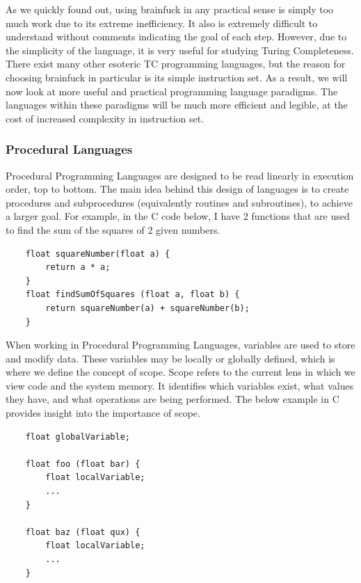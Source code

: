 As we quickly found out, using brainfuck in any practical sense is simply too much work due to its extreme inefficiency.
It also is extremely difficult to understand without comments indicating the goal of each step.
However, due to the simplicity of the language, it is very useful for studying Turing Completeness.
There exist many other esoteric TC programming languages, but the reason for choosing brainfuck in particular is its simple instruction set.
As a result, we will now look at more useful and practical programming language paradigms.
The languages within these paradigms will be much more efficient and legible, at the cost of increased complexity in instruction set.

\subsubsection{Procedural Languages}\label{subsubsec:PL}

Procedural Programming Languages are designed to be read linearly in execution order, top to bottom.
The main idea behind this design of languages is to create procedures and subprocedures (equivalently routines and subroutines), to achieve a larger goal.
For example, in the C code below, I have 2 functions that are used to find the sum of the squares of 2 given numbers. 

\begin{verbatim}
    float squareNumber(float a) {
        return a * a;
    }
    float findSumOfSquares (float a, float b) {
        return squareNumber(a) + squareNumber(b);
    }
\end{verbatim}
    
When working in Procedural Programming Languages, variables are used to store and modify data.
These variables may be locally or globally defined, which is where we define the concept of scope.
Scope refers to the current lens in which we view code and the system memory.
It identifies which variables exist, what values they have, and what operations are being performed.
The below example in C provides insight into the importance of scope.

\begin{verbatim}
    float globalVariable;

    float foo (float bar) {
        float localVariable;
        ...
    }

    float baz (float qux) {
        float localVariable;
        ...
    }
\end{verbatim}

